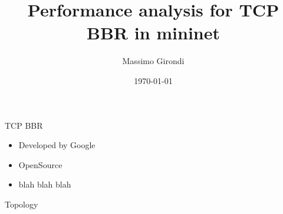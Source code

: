 \documentclass[13pt,aspectratio=43]{beamer}
\title{
	Performance analysis for TCP BBR in mininet
}
\date{\today}
\author{Massimo Girondi}
\begin{document}
\maketitle

\begin{frame}{TCP BBR}
	\begin{itemize}
		\item Developed by Google
		\item OpenSource
		\item blah blah blah
	\end{itemize}
\end{frame}


\begin{frame}{Topology}

	
\end{frame}
\end{document}
